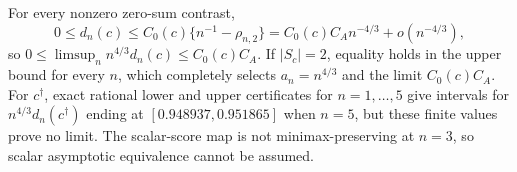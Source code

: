 For every nonzero zero-sum contrast,
\[
 0\leq d_n(c)\leq C_0(c)\{n^{-1}-\rho_{n,2}\}
 =C_0(c)C_A n^{-4/3}+o(n^{-4/3}),
\]
so \(0\leq\limsup_n n^{4/3}d_n(c)\leq C_0(c)C_A\).  If \(|S_c|=2\), equality holds in the upper bound for every \(n\), which completely selects \(a_n=n^{4/3}\) and the limit \(C_0(c)C_A\).  For \(c^\dagger\), exact rational lower and upper certificates for \(n=1,\ldots,5\) give intervals for \(n^{4/3}d_n(c^\dagger)\) ending at \([0.948937,0.951865]\) when \(n=5\), but these finite values prove no limit.  The scalar-score map is not minimax-preserving at \(n=3\), so scalar asymptotic equivalence cannot be assumed.